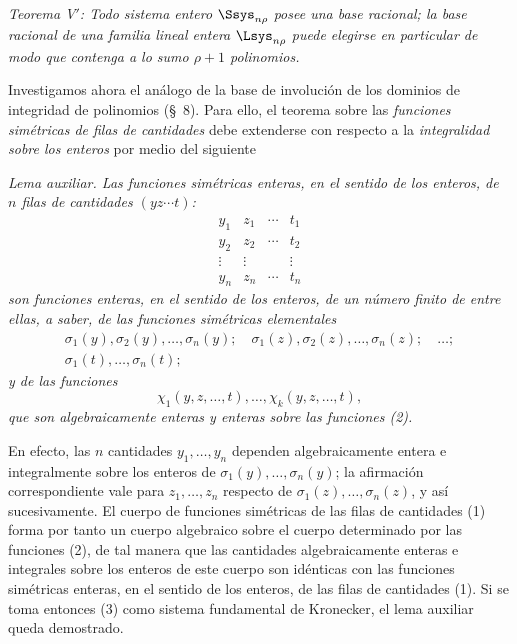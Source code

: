 \documentclass[11pt]{article}
\begin{document}
\emph{Teorema V$'$: Todo sistema entero $\Ssys_{n\rho}$ posee una base racional; la base racional de una familia lineal entera $\Lsys_{n\rho}$ puede elegirse en particular de modo que contenga a lo sumo $\rho+1$ polinomios.}

Investigamos ahora el análogo de la base de involución de los dominios de integridad de polinomios (\S\ 8). Para ello, el teorema sobre las \emph{funciones simétricas de filas de cantidades} debe extenderse con respecto a la \emph{integralidad sobre los enteros} por medio del siguiente

\emph{Lema auxiliar. Las funciones simétricas enteras, en el sentido de los enteros, de $n$ filas de cantidades $(yz\cdots t)$:}
\begin{equation}
\begin{array}{cccc}
  y_1&z_1&\cdots&t_1\\
  y_2&z_2&\cdots&t_2\\
  \vdots&\vdots&&\vdots\\
  y_n&z_n&\cdots&t_n
\end{array}
\tag{1}
\end{equation}
\emph{son funciones enteras, en el sentido de los enteros, de un número finito de entre ellas, a saber, de las funciones simétricas elementales}
\begin{equation}
\begin{gathered}
  \sigma_1(y),\sigma_2(y),\ldots,\sigma_n(y);\quad
  \sigma_1(z),\sigma_2(z),\ldots,\sigma_n(z);\quad\ldots;\\
  \sigma_1(t),\ldots,\sigma_n(t);
\end{gathered}
\tag{2}
\end{equation}
\emph{y de las funciones}
\begin{equation}
  \chi_1(y,z,\ldots,t),\ldots,\chi_k(y,z,\ldots,t),
\tag{3}
\end{equation}
\emph{que son algebraicamente enteras y enteras sobre las funciones (2).}

En efecto, las $n$ cantidades $y_1,\ldots,y_n$ dependen algebraicamente entera e integralmente sobre los enteros de $\sigma_1(y),\ldots,\sigma_n(y)$; la afirmación correspondiente vale para $z_1,\ldots,z_n$ respecto de $\sigma_1(z),\ldots,\sigma_n(z)$, y así sucesivamente. El cuerpo de funciones simétricas de las filas de cantidades (1) forma por tanto un cuerpo algebraico sobre el cuerpo determinado por las funciones (2), de tal manera que las cantidades algebraicamente enteras e integrales sobre los enteros de este cuerpo son idénticas con las funciones simétricas enteras, en el sentido de los enteros, de las filas de cantidades (1). Si se toma entonces (3) como sistema fundamental de Kronecker, el lema auxiliar queda demostrado.
\end{document}
